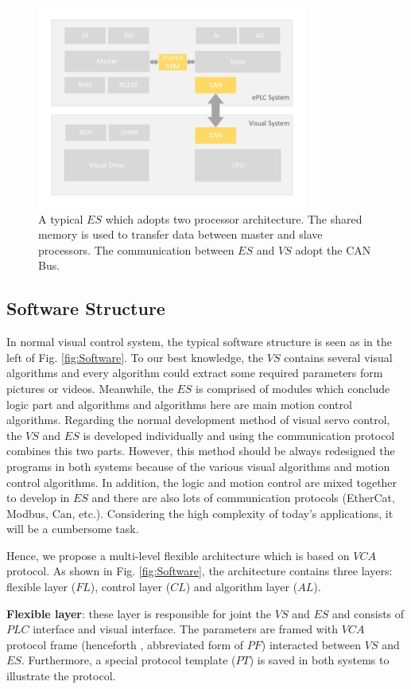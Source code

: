 \documentclass[journal,UTF8]{IEEEtran}
\begin{document}
\begin{figure}
	\centering
	\includegraphics[width=3.5in]{fig/Hardware.pdf}
	\caption{A typical $ES$ which adopts two processor architecture. The shared memory is used to transfer data between master and slave processors. The communication between $ES$ and $VS$ adopt the CAN Bus.}
	\label{fig:Hardware}
\end{figure}
\subsection{Software Structure}
In normal visual control system, the typical software structure is seen as in the left of Fig. \ref{fig:Software}.
To our best knowledge, the $VS$ contains several visual algorithms and every algorithm could extract some required parameters form pictures or videos. Meanwhile, the $ES$ is comprised of modules which conclude logic part and algorithms and algorithms here are main motion control algorithms. Regarding the normal development method of visual servo control, the $VS$ and $ES$ is developed individually and using the communication protocol combines this two parts. However, this method should be always redesigned the programs in both systems because of the various visual algorithms and motion control algorithms. In addition, the logic and motion control are mixed together to develop in $ES$ and there are also lots of communication protocols (EtherCat, Modbus, Can, etc.). Considering the high complexity of today’s applications, it will be a cumbersome task.

Hence, we propose a multi-level flexible architecture which is based on $VCA$ protocol. As shown in Fig. \ref{fig:Software}, the architecture contains three layers: flexible layer ($FL$), control layer ($CL$) and algorithm layer ($AL$).

\textbf{Flexible layer}: these layer is responsible for joint the $VS$ and $ES$ and consists of $PLC$ interface and visual interface. The parameters are framed with $VCA$ protocol frame (henceforth
, abbreviated form of $PF$) interacted between $VS$ and $ES$. Furthermore, a special protocol template ($PT$) is saved in both systems to illustrate the protocol.
\end{document}
